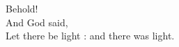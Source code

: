 \documentclass[border=15pt]{standalone}
\begin{document}
\BgThispage{}
\begin{minipage}{1.2in}
\setlength{\parindent}{10pt}
\setlength{\parskip}{3ex plus 0.5ex minus 0.2ex}
    \begin{center}
{\huge{Behold!}}\\
And God said, \\ Let there be light : and there was light.
    \end{center}
\end{minipage}
\end{document}
